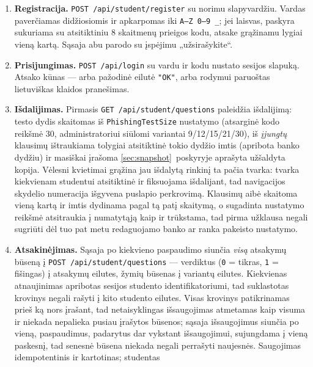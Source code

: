 \documentclass[11pt,a4paper]{article}
\newcommand{\code}[1]{\texttt{#1}}
\begin{document}
\begin{enumerate}
  \item \textbf{Registracija.} \code{POST /api/student/register} su
        norimu slapyvardžiu. Vardas paverčiamas didžiosiomis ir
        apkarpomas iki \code{A--Z 0--9 \_}; jei laisvas, paskyra
        sukuriama su atsitiktiniu 8 skaitmenų prieigos kodu, atsake
        grąžinamu lygiai vieną kartą. Sąsaja abu parodo su įspėjimu
        „užsirašykite``.
  \item \textbf{Prisijungimas.} \code{POST /api/login} su vardu ir
        kodu nustato sesijos slapuką. Atsako kūnas — arba pažodinė
        eilutė \code{"OK"}, arba rodymui paruoštas lietuviškas
        klaidos pranešimas.
  \item \textbf{Išdalijimas.} Pirmasis
        \code{GET /api/student/questions} paleidžia išdalijimą: testo
        dydis skaitomas iš \code{PhishingTestSize} nustatymo
        (atsarginė kodo reikšmė 30, administratoriui siūlomi
        variantai 9/12/15/21/30), iš \emph{įjungtų} klausimų
        ištraukiama tolygiai atsitiktinė tokio dydžio imtis
        (apribota banko dydžiu) ir masiškai įrašoma
        \ref{sec:snapshot}~poskyryje aprašyta užšaldyta kopija.
        Vėlesni kvietimai grąžina jau išdalytą rinkinį ta pačia
        tvarka: tvarka kiekvienam studentui atsitiktinė ir fiksuojama
        išdalijant, tad navigacijos skydelio numeracija išgyvena
        puslapio perkrovimą. Klausimų aibė skaitoma vieną kartą ir
        imtis dydinama pagal tą patį skaitymą, o sugadinta nustatymo
        reikšmė atsitraukia į numatytąją kaip ir trūkstama, tad pirma
        užklausa negali sugriūti dėl tuo pat metu redaguojamo banko ar
        ranka pakeisto nustatymo.
  \item \textbf{Atsakinėjimas.} Sąsaja po kiekvieno paspaudimo
        siunčia \emph{visą} atsakymų būseną į
        \code{POST /api/student/questions} — verdiktus (\code{0} =
        tikras, \code{1} = fišingas) į atsakymų eilutes, žymių
        būsenas į variantų eilutes. Kiekvienas atnaujinimas
        apribotas sesijos studento identifikatoriumi, tad suklastotas
        krovinys negali rašyti į kito studento eilutes. Visas krovinys
        patikrinamas prieš ką nors įrašant, tad netaisyklingas
        išsaugojimas atmetamas kaip visuma ir niekada nepalieka pusiau
        įrašytos būsenos; sąsaja išsaugojimus siunčia po vieną,
        paspaudimus, padarytus dar vykstant išsaugojimui, sujungdama į
        vieną paskesnį, tad senesnė būsena niekada negali perrašyti
        naujesnės. Saugojimas idempotentinis ir kartotinas; studentas

\end{enumerate}
\end{document}
